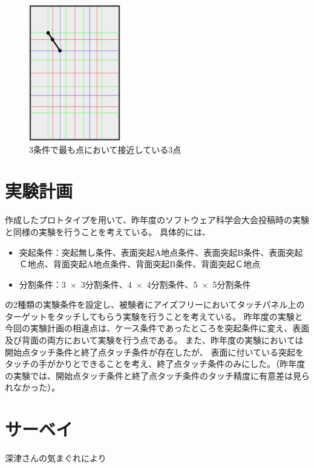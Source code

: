 \documentclass[11pt,a4paper]{jarticle}
\begin{document}
\begin{figure}[H]
  \begin{center}
  \includegraphics[width=4cm]{fig/photo5.eps}
  \caption{3条件で最も点において接近している3点}
  \label{fig:fig5}
  \end{center}
\end{figure}







\section{実験計画}
作成したプロトタイプを用いて、昨年度のソフトウェア科学会大会投稿時の実験と同様の実験を行うことを考えている。
具体的には、
\begin{itemize}
	\item 突起条件：突起無し条件、表面突起A地点条件、表面突起B条件、表面突起Ｃ地点、背面突起A地点条件、背面突起B条件、背面突起Ｃ地点
	\item 分割条件：3~$\times$~3分割条件、4~$\times$~4分割条件、5~$\times$~5分割条件
\end{itemize}
の2種類の実験条件を設定し、被験者にアイズフリーにおいてタッチパネル上のターゲットをタッチしてもらう実験を行うことを考えている。
昨年度の実験と今回の実験計画の相違点は、ケース条件であったところを突起条件に変え、表面及び背面の両方において実験を行う点である。
また、昨年度の実験においては開始点タッチ条件と終了点タッチ条件が存在したが、
表面に付いている突起をタッチの手がかりとできることを考え、終了点タッチ条件のみにした。（昨年度の実験では、開始点タッチ条件と終了点タッチ条件のタッチ精度に有意差は見られなかった）。

\section{サーベイ}
深津さんの気まぐれにより

\end{document}
